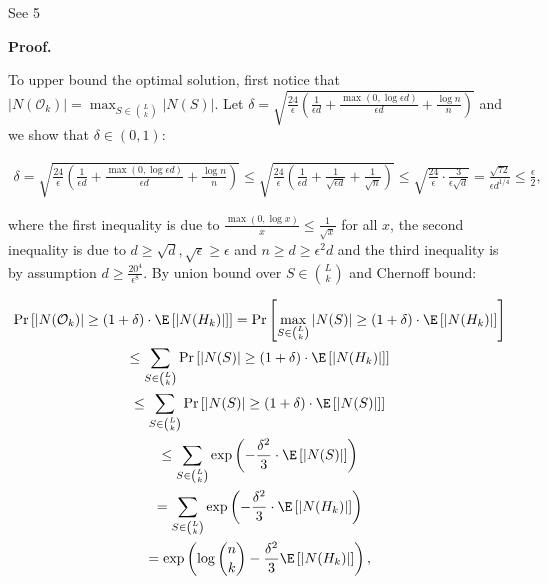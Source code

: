 \documentclass[10pt,a4paper]{article}
\begin{document}
See 5\par




\par\medskip\noindent\textbf{Proof.}\par



To upper bound the optimal solution, first notice that $|N(\mathcal{O}_{k})|=\max_{S\in\binom{L}{k}}|N(S)|$.
Let $\delta=\sqrt{\frac{24}{\epsilon}\left(\frac{1}{\epsilon d}+\frac{\max(0,\log{\epsilon d})}{\epsilon d}+\frac{\log{n}}{n}\right)}$ and we show that $\delta\in(0,1)$:\par


\[\begin{gathered}
\displaystyle\delta=\sqrt{\frac{24}{\epsilon}\left(\frac{1}{\epsilon d}+\frac{\max(0,\log{\epsilon d})}{\epsilon d}+\frac{\log{n}}{n}\right)}\leq\sqrt{\frac{24}{\epsilon}\left(\frac{1}{\epsilon d}+\frac{1}{\sqrt{\epsilon d}}+\frac{1}{\sqrt{n}}\right)}\leq\sqrt{\frac{24}{\epsilon}\cdot\frac{3}{\epsilon\sqrt{d}}}=\frac{\sqrt{72}}{\epsilon d^{1/4}}\leq\frac{\epsilon}{2},
\end{gathered}\]


where the first inequality is due to $\frac{\max(0,\log{x})}{x}\leq\frac{1}{\sqrt{x}}$ for all $x$, the second inequality is due to $d\geq\sqrt{d},\sqrt{\epsilon}\geq\epsilon$ and $n\geq d\geq\epsilon^{2}d$ and the third inequality is by assumption $d\geq\frac{20^{4}}{\epsilon^{8}}$.
By union bound over $S\in\binom{L}{k}$ and Chernoff bound:\par


\[\begin{gathered}
\displaystyle\Pr\left[|N(\mathcal{O}_{k})|\geq(1+\delta)\cdot\E\left[|N(H_{k})|\right]\right] \displaystyle=\Pr\left[\max_{S\in\binom{L}{k}}|N(S)|\geq(1+\delta)\cdot\E\left[|N(H_{k})|\right]\right] \\
\displaystyle\leq\sum_{S\in\binom{L}{k}}\Pr\left[|N(S)|\geq(1+\delta)\cdot\E\left[|N(H_{k})|\right]\right] \\
\displaystyle\leq\sum_{S\in\binom{L}{k}}\Pr\left[|N(S)|\geq(1+\delta)\cdot\E\left[|N(S)|\right]\right] \\
\displaystyle\leq\sum_{S\in\binom{L}{k}}\exp\left(-\frac{\delta^{2}}{3}\cdot\E\left[|N(S)|\right]\right) \\
\displaystyle=\sum_{S\in\binom{L}{k}}\exp\left(-\frac{\delta^{2}}{3}\cdot\E\left[|N(H_{k})|\right]\right) \\
\displaystyle=\exp\left(\log{\binom{n}{k}}-\frac{\delta^{2}}{3}\E\left[|N(H_{k})|\right]\right),
\end{gathered}\]
\end{document}
